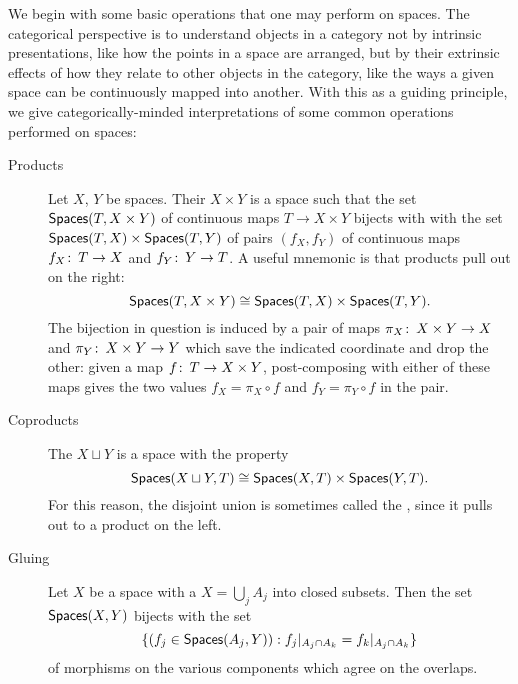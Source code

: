 We begin with some basic operations that one may perform on spaces.
The categorical perspective is to understand objects in a category not by intrinsic presentations, like how the points in a space are arranged, but by their extrinsic effects of how they relate to other objects in the category, like the ways a given space can be continuously mapped into another.
With this as a guiding principle, we give categorically-minded interpretations of some common operations performed on spaces:
\begin{description}
    \item[Products]
    Let $X$, $Y$ be spaces.
    Their  $X \times Y$ is a space such that the set $\mathsf{Spaces}(T, X \times Y)$ of continuous maps $T \to X \times Y$ bijects with with the set $\mathsf{Spaces}(T, X) \times \mathsf{Spaces}(T, Y)$ of pairs $(f_X, f_Y)$ of continuous maps $f_X\colon\thinspace T \to X$ and $f_Y\colon\thinspace Y \to T$.
    A useful mnemonic is that products pull out on the right: \[\mathsf{Spaces}(T, X \times Y) \cong \mathsf{Spaces}(T, X) \times \mathsf{Spaces}(T, Y).\]
    The bijection in question is induced by a pair of maps $\pi_X\colon\thinspace X \times Y \to X$ and $\pi_Y\colon\thinspace X \times Y \to Y$ which save the indicated coordinate and drop the other: given a map $f\colon\thinspace T \to X \times Y$, post-composing with either of these maps gives the two values $f_X = \pi_X \circ f$ and $f_Y = \pi_Y \circ f$ in the pair.%
    \item[Coproducts]
    The  $X \sqcup Y$ is a space with the property \[\mathsf{Spaces}(X \sqcup Y, T) \cong \mathsf{Spaces}(X, T) \times \mathsf{Spaces}(Y, T).\]
    For this reason, the disjoint union is sometimes called the , since it pulls out to a product on the left.
    \item[Gluing]
    Let $X$ be a space with a  $X = \bigcup_j A_j$ into closed subsets.
    Then the set $\mathsf{Spaces}(X, Y)$ bijects with the set \[\{(f_j \in \mathsf{Spaces}(A_j, Y)) : f_j|_{A_j \cap A_k} = f_k|_{A_j \cap A_k}\}\] of morphisms on the various components which agree on the overlaps.

\end{description}
